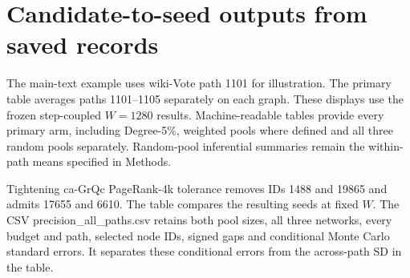 \section{Candidate-to-seed outputs from saved records}
The main-text example uses wiki-Vote path 1101 for illustration. The primary table averages paths 1101--1105 separately on each graph. These displays use the frozen step-coupled $W=1280$ results. Machine-readable tables provide every primary arm, including Degree-5\%, weighted pools where defined and all three random pools separately. Random-pool inferential summaries remain the within-path means specified in Methods.

Tightening ca-GrQc PageRank-4k tolerance removes IDs 1488 and 19865 and admits 17655 and 6610. The table compares the resulting seeds at fixed $W$. The CSV precision\_all\_paths.csv retains both pool sizes, all three networks, every budget and path, selected node IDs, signed gaps and conditional Monte Carlo standard errors. It separates these conditional errors from the across-path SD in the table.
